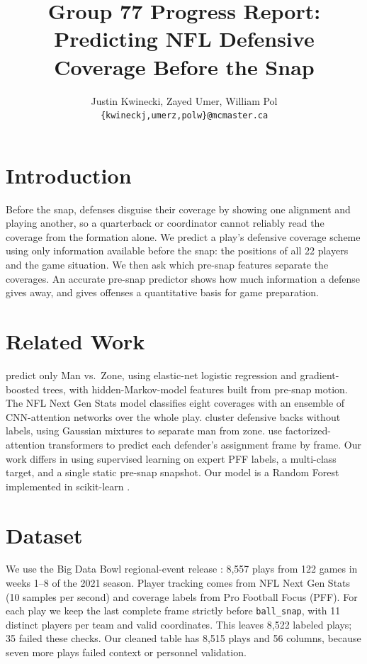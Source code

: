 \documentclass[11pt]{article}
\title{Group 77 Progress Report:\\Predicting NFL Defensive Coverage Before the Snap}
\author{Justin Kwinecki, Zayed Umer, William Pol \\
  \texttt{\{kwineckj,umerz,polw\}@mcmaster.ca} }
\begin{document}
\maketitle

\section{Introduction}

Before the snap, defenses disguise their coverage by showing one alignment and playing another, so a quarterback or coordinator cannot reliably read the coverage from the formation alone. We predict a play's defensive coverage scheme using only information available before the snap: the positions of all 22 players and the game situation. We then ask which pre-snap features separate the coverages. An accurate pre-snap predictor shows how much information a defense gives away, and gives offenses a quantitative basis for game preparation.

\section{Related Work}

\citet{michels2026integrating} predict only Man vs.\ Zone, using elastic-net logistic regression and gradient-boosted trees, with hidden-Markov-model features built from pre-snap motion. The NFL Next Gen Stats model \citep{song2023identifying} classifies eight coverages with an ensemble of CNN-attention networks over the whole play. \citet{dutta2020unsupervised} cluster defensive backs without labels, using Gaussian mixtures to separate man from zone. \citet{song2026decoding} use factorized-attention transformers to predict each defender's assignment frame by frame. Our work differs in using supervised learning on expert PFF labels, a multi-class target, and a single static pre-snap snapshot. Our model is a Random Forest \citep{breiman2001random} implemented in scikit-learn \citep{pedregosa2011scikit}.

\section{Dataset}

We use the Big Data Bowl regional-event release \citep{bigdatabowl2021regional}: 8,557 plays from 122 games in weeks 1--8 of the 2021 season. Player tracking comes from NFL Next Gen Stats (10 samples per second) and coverage labels from Pro Football Focus (PFF). For each play we keep the last complete frame strictly before \texttt{ball\_snap}, with 11 distinct players per team and valid coordinates. This leaves 8,522 labeled plays; 35 failed these checks. Our cleaned table has 8,515 plays and 56 columns, because seven more plays failed context or personnel validation.
\end{document}

